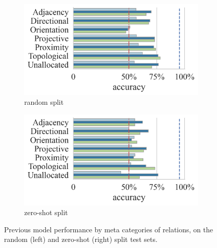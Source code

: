 \begin{figure}[ht]
    \centering
\begin{subfigure}[b]{0.49\linewidth}
    \centering
    \includegraphics[width=\linewidth]{images/visual-spatial-reasoning/performance_by_meta_cat_random_split_v2.png}
    \caption{random split}
\end{subfigure}
\begin{subfigure}[b]{0.49\linewidth}
    \centering
    \includegraphics[width=\linewidth]{images/visual-spatial-reasoning/performance_by_meta_cat_zeroshot_split_v2.png}
    \caption{zero-shot split}
\end{subfigure}
\caption{Previous model performance by meta categories of relations, on the random (left) and zero-shot (right) split test sets.}
    \label{fig:performance_by_meta_cat_base}
\end{figure}

